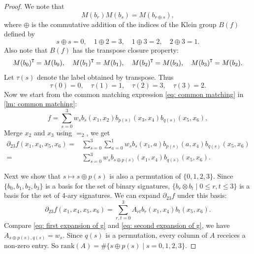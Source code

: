 \begin{proof}
    We note that $$M(b_r)M(b_s)=M(b_{r\oplus s}),$$
    where $\oplus$ is the commutative addition of the indices of the Klein group $B(f)$ defined by
    $$
    s\oplus s=0, \quad 1\oplus2=3, \quad 1\oplus 3=2,\quad 2\oplus 3=1.
    $$
    Also note that $B(f)$ has the transpose closure property:
    $$
    M(b_0)^{\tt T}=M(b_0), \quad
    M(b_1)^{\tt T}=M(b_1), \quad
    M(b_2)^{\tt T}=M(b_3), \quad 
    M(b_3)^{\tt T}=M(b_2).
    $$
    Let \(\tau(s)\) denote the label obtained by transpose. 
    Thus
    \[
    \tau(0)=0,\quad \tau(1)=1,\quad
    \tau(2)=3,\quad \tau(3)=2.
    \]
    Now we start from the common matching expression \eqref{eq: common matching} in \cref{lm: common matching}:
    \begin{equation*}    
        f=\sum_{s=0}^3w_sb_s(x_1,x_2)b_{p(s)}(x_3,x_4)b_{q(s)}(x_5,x_6),
    \end{equation*}
    Merge $x_2$ and $x_3$ using $=_2$, we get 
    \begin{equation}\label{eq: first expansion of g}
        \begin{aligned}
            \partial_{23}f(x_1,x_4,x_5,x_6)
            =&\sum_{s=0}^3\sum_{a=0}^1 w_sb_s(x_1,a)b_{p(s)}(a,x_4)b_{q(s)}(x_5,x_6)\\
            =&\sum_{s=0}^3w_sb_{s\oplus p(s)}(x_1,x_4)b_{q(s)}(x_5,x_6).
        \end{aligned}
    \end{equation}
    
    Next we show that $s\mapsto s\oplus p(s)$ is also a permutation of $\{0,1,2,3\}.$
    Since $\{b_0,b_1,b_2,b_3\}$ is a basis for the set of binary signatures, $\{b_r\otimes b_t\mid 0\le r,t\le 3\}$ is a basis for the set of 4-ary signatures.
    We can expand $\partial_{23}f$ under this basis:
    \begin{equation}\label{eq: second expansion of g}
        \partial_{23}f(x_1,x_4,x_5,x_6)=\sum_{r,t=0}^3 A_{rt}b_r(x_1,x_4)b_t(x_5,x_6).
    \end{equation}
    Compare \eqref{eq: first expansion of g} and \eqref{eq: second expansion of g}, we have $A_{s\oplus p(s),q(s)}=w_s.$
    Since $q(s)$ is a permutation, every column of $A$ receices a non-zero entry. 
    So $\mathrm{rank}(A)=\#\{s\oplus p(s)\mid s=0,1,2,3\}.$


\end{proof}
